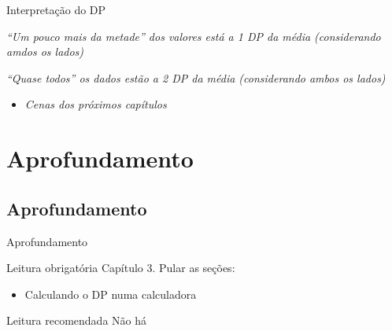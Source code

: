 \documentclass{beamer}
\begin{document}
\begin{frame}{\scriptsize Interpretação do DP}
  \begin{block}{}
    \footnotesize
    {\em ``Um pouco mais da metade'' dos valores está a 1 DP da média (considerando amdos os lados)}
  \end{block}
  \begin{block}{}
    \footnotesize
    {\em ``Quase todos'' os dados estão a 2 DP da média (considerando ambos os lados)}
  \end{block}
  \begin{itemize}
    \footnotesize
  \item {\em Cenas dos próximos capítulos}
  \end{itemize}
\end{frame}

\section{Aprofundamento}

\subsection{Aprofundamento}

\begin{frame}{\scriptsize Aprofundamento}
  \begin{block}{Leitura obrigatória}
    \footnotesize
    Capítulo 3. Pular as seções:
    \begin{itemize}
      \footnotesize
    \item Calculando o DP numa calculadora
    \end{itemize}
  \end{block}
  \begin{block}{Leitura recomendada}
    \scriptsize
    Não há
  \end{block}
\end{frame}
\end{document}
